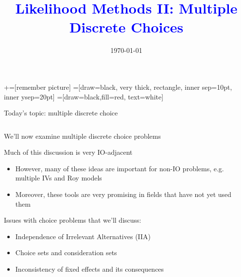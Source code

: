 \documentclass[notes,11pt, aspectratio=169]{beamer}
\title[]{\textcolor{blue}{Likelihood Methods II: Multiple Discrete Choices}}
\author[PGP]{}
\institute[FRBNY]{\small{Paul Goldsmith-Pinkham}}
\date{\today}
\newenvironment{wideitemize}{\itemize\addtolength{\itemsep}{10pt}}{\enditemize}
\begin{document}
\newcommand\marktopleft[1]{%
    \tikz[overlay,remember picture] 
        \node (marker-#1-a) at (-.3em,.3em) {};%
}
\newcommand\markbottomright[2]{%
    \tikz[overlay,remember picture] 
        \node (marker-#1-b) at (0em,0em) {};%
}
+=[remember picture] 
 =[draw=black, very thick, rectangle, inner sep=10pt, inner ysep=20pt]
 =[draw=black,fill=red, text=white]

\begin{frame}
\maketitle

\end{frame}


\begin{frame}{Today's topic: multiple discrete choice}
  \begin{columns}[T] %
    \begin{column}{.7\textwidth}
      \begin{wideitemize}
      \item We'll now examine multiple discrete choice problems 
      \item Much of this discussion is very IO-adjacent
        \begin{itemize}
        \item However, many of these ideas are important for
          non-IO problems, e.g. multiple IVs and Roy models
        \item Moreover, these tools are very promising in fields that
          have not yet used them
        \end{itemize}
      \item Issues with choice problems that we'll discuss:
        \begin{itemize}
        \item Independence of Irrelevant Alternatives (IIA)
        \item Choice sets and consideration sets
        \item Inconsistency of fixed effects and its consequences
        \end{itemize}
      \end{wideitemize}
    \end{column}%
  \hfill%
  \begin{column}{.4\textwidth}
  \end{column}
\end{columns}
\end{frame}
\end{document}
